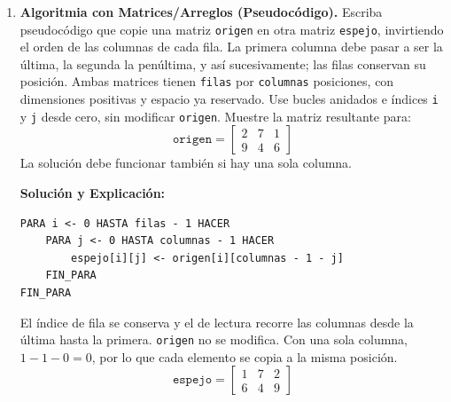 \documentclass[11pt,letterpaper]{article}
\begin{document}
\begin{enumerate}[label=\textbf{\arabic*.}]
    \newpage
    \item \textbf{Algoritmia con Matrices/Arreglos (Pseudocódigo).}
    Escriba pseudocódigo que copie una matriz \texttt{origen} en otra matriz \texttt{espejo}, invirtiendo el orden de las columnas de cada fila. La primera columna debe pasar a ser la última, la segunda la penúltima, y así sucesivamente; las filas conservan su posición.
    Ambas matrices tienen \texttt{filas} por \texttt{columnas} posiciones, con dimensiones positivas y espacio ya reservado. Use bucles anidados e índices \texttt{i} y \texttt{j} desde cero, sin modificar \texttt{origen}. Muestre la matriz resultante para:
    \[
    \texttt{origen} =
    \begin{bmatrix}
    2 & 7 & 1 \\
    9 & 4 & 6
    \end{bmatrix}
    \]
    La solución debe funcionar también si hay una sola columna.
    \begin{solucionbox}
    \textbf{Solución y Explicación:}
    \begin{lstlisting}[style=pseudocodigo]
PARA i <- 0 HASTA filas - 1 HACER
    PARA j <- 0 HASTA columnas - 1 HACER
        espejo[i][j] <- origen[i][columnas - 1 - j]
    FIN_PARA
FIN_PARA
    \end{lstlisting}
    El índice de fila se conserva y el de lectura recorre las columnas desde la última hasta la primera. \texttt{origen} no se modifica. Con una sola columna, $1-1-0=0$, por lo que cada elemento se copia a la misma posición.
    \[
    \texttt{espejo} =
    \begin{bmatrix}
    1 & 7 & 2 \\
    6 & 4 & 9
    \end{bmatrix}
    \]
    \end{solucionbox}
\end{enumerate}
\end{document}
